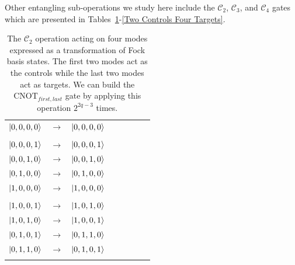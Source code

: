 \documentclass[aps,pra,twocolumn,showpacs,superscriptaddress,floatfix,10pt]{revtex4}
\begin{document}
Other entangling sub-operations we study here include the $\mathcal{C}_2$, $\mathcal{C}_3$, and $\mathcal{C}_4$ gates which are presented in Tables~\ref{Two Controls Two Targets}-\ref{Two Controls Four Targets}.
\begin {table}[h]
\begin{center}
	\begin{tabular}{l*{6}{c}r} 
		$\ket{0,0,0,0}$  &  $\rightarrow$ & $\ket{0,0,0,0}$ \\ \\
		$\ket{0,0,0,1}$  & $\rightarrow$ & $\ket{0,0,0,1}$ \\
		$\ket{0,0,1,0}$ & $\rightarrow$ & $\ket{0,0,1,0}$ \\
		$\ket{0,1,0,0}$ & $\rightarrow$ & $\ket{0,1,0,0} $ \\ 
		$\ket{1,0,0,0}$ & $\rightarrow$ & $\ket{1,0,0,0} $ \\ \\
		$\ket{1,0,0,1}$  & $\rightarrow$ & $\ket{1,0,1,0}$ \\
		$\ket{1,0,1,0}$ & $\rightarrow$ & $\ket{1,0,0,1}$ \\
		$\ket{0,1,0,1}$ & $\rightarrow$ & $\ket{0,1,1,0} $ \\ 
		$\ket{0,1,1,0}$ & $\rightarrow$ & $\ket{0,1,0,1} $ \\ \\
	\end{tabular}
	\caption{ \label{Two Controls Two Targets} The $\mathcal{C}_2$  operation acting on four modes expressed as a transformation of Fock basis states. The first two modes act as the controls while the last two modes act as targets. We can build the $\mbox{CNOT}_{first,last}$ gate by applying this operation $2^{2 q - 3}$ times.}
\end{center}
\end{table}
\end{document}
